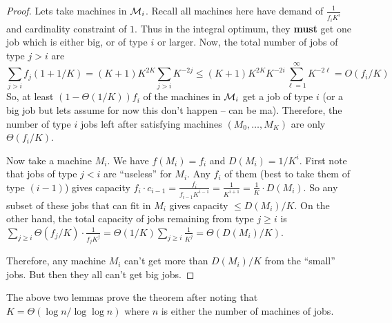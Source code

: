 	\begin{proof}
		Lets take machines in $\mathcal{M}_i$. Recall all machines here have demand of $\frac{1}{f_iK^i}$ and cardinality constraint of $1$.
		Thus in the integral optimum, they {\bf must} get one job which is either big, or of type $i$ or larger.
		Now, the total number of jobs of type $j > i$ are
		\[
		\sum_{j>i} f_j(1+1/K) = (K+1)K^{2K} \sum_{j > i} K^{-2j} \leq  (K+1)K^{2K}K^{-2i} \sum_{\ell=1}^\infty K^{-2\ell} = O\left(f_i/K\right)
		\]
		So, at least $(1 - \Theta(1/K))f_i$ of the machines in $\mathcal{M}_i$ get a job of type $i$ (or a big job but lets assume for now this don't happen -- can be ma).
		Therefore, the number of type $i$ jobs left after satisfying machines $(M_0,\ldots,M_K)$ are only $\Theta(f_i/K)$.
		
		
		Now take a machine $M_i$. We have $f(M_i) = f_i$ and $D(M_i) = 1/K^i$.
		First note that jobs of type $j < i$ are ``useless'' for $M_i$. Any $f_i$ of them (best to take them of type $(i-1)$)  gives capacity $f_i\cdot c_{i-1}  = \frac{f_i}{f_{i-1}K^{i-1}} = \frac{1}{K^{i+1}} =  \frac{1}{K}\cdot D(M_i)$. So any subset of these jobs that can fit in $M_i$ gives capacity $\leq D(M_i)/K$.
		On the other hand, the total capacity of jobs remaining from type $j \geq i$ is  $\sum_{j\geq i} \Theta(f_j/K)\cdot \frac{1}{f_jK^j} = \Theta(1/K)\sum_{j\geq i} \frac{1}{K^j} = \Theta(D(M_i)/K)$.
		
		Therefore, any machine $M_i$ can't get more than $D(M_i)/K$ from the ``small'' jobs. But then they all can't get big jobs.
	\end{proof}
	The above two lemmas prove the theorem after noting that $K = \Theta(\log n/\log\log n)$ where $n$ is either the number of machines of jobs.
